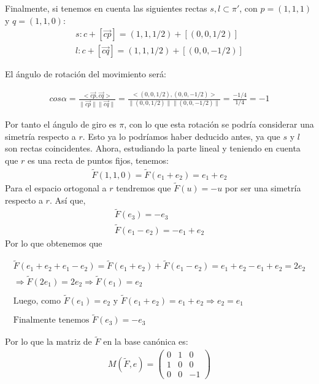 Finalmente, si tenemos en cuenta las siguientes rectas $s,l \subset \pi'$, con $p=(1,1,1)$ y $q=(1,1,0)$:
\begin{gather*}
    s: c + [\Vec{cp}] = (1,1,1/2) + [(0,0,1/2)] \\
    l: c + [\Vec{cq}] = (1,1,1/2) + [(0,0,-1/2)]
\end{gather*}

El ángulo de rotación del movimiento será:

\begin{gather*}
    cos\alpha = \frac{<\Vec{cp},\Vec{cq}>}{\|\Vec{cp}\| \|\Vec{cq}\|} = \frac{<(0,0,1/2),(0,0,-1/2)>}{\|(0,0,1/2)\| \|(0,0,-1/2)\|} = \frac{-1/4}{1/4} = -1
\end{gather*}

Por tanto el ángulo de giro es $\pi$, con lo que esta rotación se podría considerar una simetría respecto a $r$. Esto ya lo podríamos haber deducido antes, ya que $s$ y $l$ son rectas coincidentes. Ahora, estudiando la parte lineal y teniendo en cuenta que $r$ es una recta de puntos fijos, tenemos:
\begin{gather*}
    \widetilde{F}(1,1,0) = \widetilde{F}(e_1 + e_2) = e_1 + e_2
\end{gather*}
Para el espacio ortogonal a $r$ tendremos que $\widetilde{F}(u) = -u$ por ser una simetría respecto a $r$. Así que,
\begin{gather*}
    \widetilde{F}(e_3) = -e_3\\
    \widetilde{F}(e_1 - e_2) = -e_1 + e_2
\end{gather*}
Por lo que obtenemos que

\begin{gather*}
    \widetilde{F}(e_1 + e_2 + e_1- e_2) = \widetilde{F}(e_1 + e_2) + \widetilde{F}(e_1 - e_2) = e_1 + e_2 - e_1 + e_2 = 2e_2\\ \Longrightarrow \widetilde{F}(2e_1) = 2e_2 \Longrightarrow \widetilde{F}(e_1) = e_2\\ \\\text{Luego, como }\widetilde{F}(e_1)=e_2 \text{ y } \widetilde{F}(e_1 + e_2)= e_1 + e_2 \Longrightarrow e_2 = e_1\\ \\
    \text{Finalmente tenemos } \widetilde{F}(e_3) = -e_3
\end{gather*}

Por lo que la matriz de $\widetilde{F}$ en la base canónica es:
\begin{gather*}
    M(\widetilde{F},e) = 
    \begin{pmatrix}
    0 & 1 & 0\\
    1 & 0 & 0\\
    0 & 0 & -1
    \end{pmatrix}
\end{gather*}

